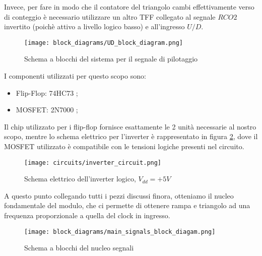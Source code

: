Invece, per fare in modo che il contatore del triangolo cambi effettivamente verso di conteggio
è necessario utilizzare un altro TFF collegato al segnale $RCO2$ invertito (poichè attivo a
livello logico basso) e all'ingresso $U/D$.
\medskip

\begin{figure}[ht]
    \centering
    \texttt{[image: block\_diagrams/UD\_block\_diagram.png]}
    \caption{Schema a blocchi del sistema per il segnale di pilotaggio}
    \label{UD_block_diagram}
\end{figure}

I componenti utilizzati per questo scopo sono:

\begin{itemize}
    \item Flip-Flop: 74HC73 \cite{74hc73};
    \item MOSFET: 2N7000 \cite{2n7000};
\end{itemize}

Il chip utilizzato per i flip-flop fornisce esattamente le 2 unità necessarie al nostro
scopo, mentre lo schema elettrico per l'inverter è rappresentato in figura
\ref{inverter_circuit}, dove il MOSFET utilizzato è compatibile con le tensioni logiche
presenti nel circuito.
\medskip

\begin{figure}[ht]
    \centering
    \texttt{[image: circuits/inverter\_circuit.png]}
    \caption{Schema elettrico dell'inverter logico, $V_{dd}=+5V$}
    \label{inverter_circuit}
\end{figure}

A questo punto collegando tutti i pezzi discussi finora, otteniamo il nucleo fondamentale
del modulo, che ci permette di ottenere rampa e triangolo ad una frequenza proporzionale
a quella del clock in ingresso.
\medskip

\begin{figure}[ht]
    \centering
    \texttt{[image: block\_diagrams/main\_signals\_block\_diagam.png]}
    \caption{Schema a blocchi del nucleo segnali}
    \label{main_signals_block_diagram}
\end{figure}

